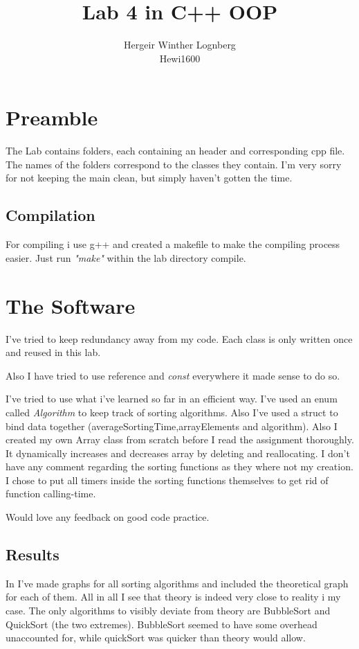 \documentclass[11pt]{article}
\title{\textbf{Lab 4 in C++ OOP}}
\author{Hergeir Winther Lognberg \\
Hewi1600}
\date{}
\begin{document}
\maketitle

\section{Preamble}

The Lab contains folders, each containing an header and corresponding cpp file. The names of the folders correspond to the classes they contain. I'm very sorry for not keeping the main clean, but simply haven't gotten the time.

\subsection{Compilation}
For compiling i use g++ and created a makefile to make the compiling process easier. Just run \emph{"make"} within the lab directory compile.

\section{The Software}
I've tried to keep redundancy away from my code. Each class is only written once and reused in this lab.

Also I have tried to use reference and \emph{const} everywhere it made sense to do so. 

I've tried to use what i've learned so far in an efficient way. I've used an enum called \emph{Algorithm} to keep track of sorting algorithms. Also I've used a struct to bind data together (averageSortingTime,arrayElements and algorithm). Also I created my own Array class from scratch before I read the assignment thoroughly. It dynamically increases and decreases array by deleting and reallocating. I don't have any comment regarding the sorting functions as they where not my creation. I chose to put all timers inside the sorting functions themselves to get rid of function calling-time. 

Would love any feedback on good code practice.

\subsection{Results}
In I've made graphs for all sorting algorithms and included the theoretical graph for each of them. All in all I see that theory is indeed very close to reality i my case. The only algorithms to visibly deviate from theory are BubbleSort and QuickSort (the two extremes). BubbleSort seemed to have some overhead unaccounted for, while quickSort was quicker than theory would allow.
\end{document}
